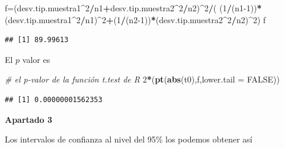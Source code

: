 \documentclass[
]{article}
\newenvironment{Shaded}{\begin{snugshade}}{\end{snugshade}}
\newcommand{\CommentTok}[1]{\textcolor[rgb]{0.56,0.35,0.01}{\textit{#1}}}
\newcommand{\DataTypeTok}[1]{\textcolor[rgb]{0.13,0.29,0.53}{#1}}
\newcommand{\DecValTok}[1]{\textcolor[rgb]{0.00,0.00,0.81}{#1}}
\newcommand{\FloatTok}[1]{\textcolor[rgb]{0.00,0.00,0.81}{#1}}
\newcommand{\KeywordTok}[1]{\textcolor[rgb]{0.13,0.29,0.53}{\textbf{#1}}}
\newcommand{\NormalTok}[1]{#1}
\newcommand{\OperatorTok}[1]{\textcolor[rgb]{0.81,0.36,0.00}{\textbf{#1}}}
\newcommand{\OtherTok}[1]{\textcolor[rgb]{0.56,0.35,0.01}{#1}}
\newcommand{\StringTok}[1]{\textcolor[rgb]{0.31,0.60,0.02}{#1}}
\begin{document}
\begin{Shaded}
\begin{Highlighting}[]
\NormalTok{f=(desv.tip.muestra1}\OperatorTok{\^{}}\DecValTok{2}\OperatorTok{/}\NormalTok{n1}\OperatorTok{+}\NormalTok{desv.tip.muestra2}\OperatorTok{\^{}}\DecValTok{2}\OperatorTok{/}\NormalTok{n2)}\OperatorTok{\^{}}\DecValTok{2}\OperatorTok{/}\NormalTok{(}
\NormalTok{  (}\DecValTok{1}\OperatorTok{/}\NormalTok{(n1}\DecValTok{{-}1}\NormalTok{))}\OperatorTok{*}\NormalTok{(desv.tip.muestra1}\OperatorTok{\^{}}\DecValTok{2}\OperatorTok{/}\NormalTok{n1)}\OperatorTok{\^{}}\DecValTok{2}\OperatorTok{+}\NormalTok{(}\DecValTok{1}\OperatorTok{/}\NormalTok{(n2}\DecValTok{{-}1}\NormalTok{))}\OperatorTok{*}\NormalTok{(desv.tip.muestra2}\OperatorTok{\^{}}\DecValTok{2}\OperatorTok{/}\NormalTok{n2)}\OperatorTok{\^{}}\DecValTok{2}\NormalTok{)}
\NormalTok{f}
\end{Highlighting}
\end{Shaded}

\begin{verbatim}
## [1] 89.99613
\end{verbatim}

El \(p\) valor es

\begin{Shaded}
\begin{Highlighting}[]
\CommentTok{\# el p{-}valor de la función t.test de  R}
\DecValTok{2}\OperatorTok{*}\NormalTok{(}\KeywordTok{pt}\NormalTok{(}\KeywordTok{abs}\NormalTok{(t0),f,}\DataTypeTok{lower.tail =} \OtherTok{FALSE}\NormalTok{))}
\end{Highlighting}
\end{Shaded}

\begin{verbatim}
## [1] 0.00000001562353
\end{verbatim}

\textbf{Apartado 3}

Los intervalos de confianza al nivel del 95\% los podemos obtener así

\begin{Shaded}
\end{Shaded}
\end{document}
